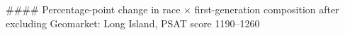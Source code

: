 #### Percentage-point change in race × first-generation composition after excluding Geomarket: Long Island, PSAT score 1190–1260

